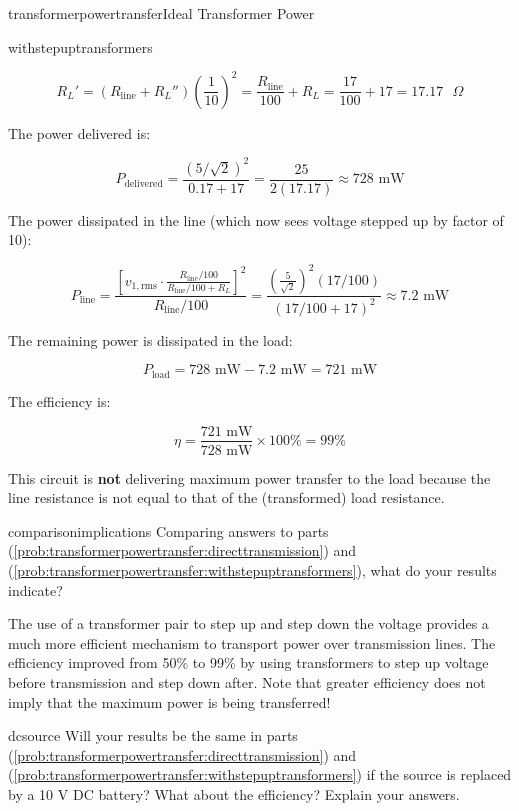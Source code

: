 \begin{mainquestion}{transformerpowertransfer}{Ideal Transformer Power}
\begin{partquestion}{withstepuptransformers}
\begin{answer}
\[
R_L' = \left(R_{\text{line}} + R_L''\right) \left(\frac{1}{10}\right)^2 = \frac{R_{\text{line}}}{100} + R_L = \frac{17}{100} + 17 = 17.17\text{ }\Omega
\]

The power delivered is:

\[
P_{\text{delivered}} = \frac{(5/\sqrt{2})^2}{0.17 + 17} = \frac{25}{2(17.17)} \approx 728\text{ mW}
\]

The power dissipated in the line (which now sees voltage stepped up by factor of 10):

\[
P_{\text{line}} = \frac{[v_{1,\text{rms}} \cdot \frac{R_{\text{line}}/100}{ R_{\text{line}}/100 + R_L}]^2}{R_{\text{line}}/100} = \frac{(\frac{5}{\sqrt{2}})^2(17/100)}{(17/100 + 17)^2} \approx 7.2\text{ mW}
\]

The remaining power is dissipated in the load:

\[
P_{\text{load}} = 728\text{ mW} - 7.2\text{ mW} = 721\text{ mW}
\]

The efficiency is:

\[
\eta = \frac{721\text{ mW}}{728\text{ mW}} \times 100\% = 99\%
\]

This circuit is \textbf{not} delivering maximum power transfer to the load because the line resistance is not equal to that of the (transformed) load
resistance.
\end{answer}
\end{partquestion}

\begin{partquestion}{comparisonimplications}
{Comparing answers to parts (\cref{prob:transformerpowertransfer:directtransmission}) and (\cref{prob:transformerpowertransfer:withstepuptransformers}), what do your results indicate?}

\begin{answer}
The use of a transformer pair to step up and step down the voltage provides a much more efficient mechanism to transport power over transmission lines. The efficiency improved from 50\% to 99\% by using transformers to step up voltage before transmission and step down after. Note that greater efficiency does not imply that the maximum power is being transferred!
\end{answer}
\end{partquestion}

\begin{partquestion}{dcsource}
{Will your results be the same in parts (\cref{prob:transformerpowertransfer:directtransmission}) and (\cref{prob:transformerpowertransfer:withstepuptransformers}) if the source is replaced by a 10 V DC battery? What about the efficiency? Explain your answers.}


\end{partquestion}
\end{mainquestion}
